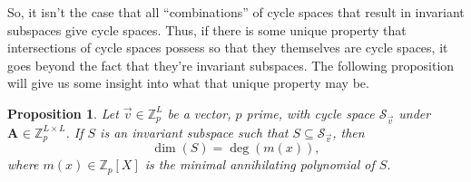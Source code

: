 \documentclass[a4paper, 12pt, reqno]{amsart}
\newtheorem{prop}{Proposition}
\newcommand{\Z}{\mathbb{Z}}
\newcommand\Mat[2][]{\mathbf{#1}^{\!#2}}
\newcommand{\cycsp}[1]{\mathcal{S}_{#1}}
\newcommand{\dq}[1]{``#1''}
\begin{document}
	So, it isn't the case that all \dq{combinations} of cycle spaces that result in invariant subspaces give cycle spaces. Thus, if there is some unique property that 
	intersections of cycle spaces possess so that they themselves are cycle spaces, it goes beyond the fact that they're invariant subspaces. The following proposition will 
	give us some insight into what that unique property may be.
	
	\begin{prop}
		\label{prop:cycSpaceInteriorRestrictions}
		Let $\vec{v} \in \Z_p^L$ be a vector, $p$ prime, with cycle space $\cycsp{\vec{v}}$ under $\Mat[A]{} \in \Z_p^{L \times L}$. If $S$ is an invariant subspace such that 
		$S \subseteq \cycsp{\vec{v}}$, then
		\[
			\dim(S) = \deg(m(x)),
		\]
		where $m(x) \in \Z_p[X]$ is the minimal annihilating polynomial of $S$.
	\end{prop}
\end{document}
